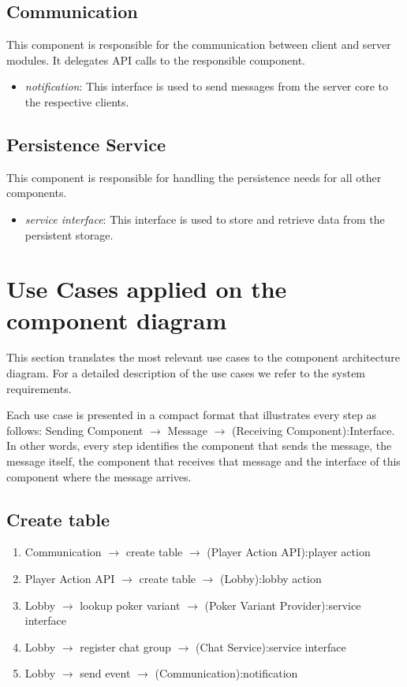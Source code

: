 \documentclass[a4paper,11pt]{report}
\begin{document}
\subsection{Communication}
This component is responsible for the communication between client and server modules. It delegates API calls to the responsible component.
\begin{itemize}
\item \emph{notification}: This interface is used to send messages from the server core to the respective clients.
\end{itemize}

\subsection{Persistence Service}
This component is responsible for handling the persistence needs for all other components.
\begin{itemize}
\item \emph{service interface}: This interface is used to store and retrieve data from the persistent storage.
\end{itemize}

\section{Use Cases applied on the component diagram}
This section translates the most relevant use cases to the component architecture diagram. For a detailed description of the use cases we refer to the system requirements.

Each use case is presented in a compact format that illustrates every step as follows: Sending Component $\rightarrow$ Message $\rightarrow$ (Receiving Component):Interface. In other words, every step identifies the component that sends the message, the message itself, the component that receives that message and the interface of this component where the message arrives.

\subsection{Create table}
\begin{enumerate}
\item Communication $\rightarrow$ create table $\rightarrow$ (Player Action API):player action
\item Player Action API $\rightarrow$ create table $\rightarrow$ (Lobby):lobby action
\item Lobby $\rightarrow$ lookup poker variant $\rightarrow$ (Poker Variant Provider):service interface
\item Lobby $\rightarrow$ register chat group $\rightarrow$ (Chat Service):service interface
\item Lobby $\rightarrow$ send event $\rightarrow$ (Communication):notification
\end{enumerate}
\end{document}
